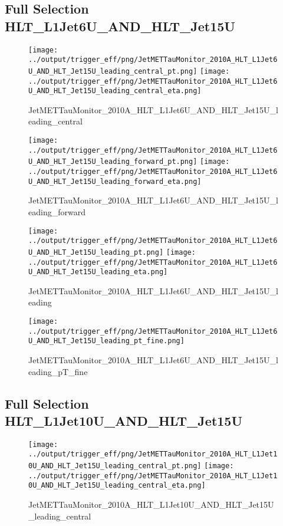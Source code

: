 \documentclass[11pt]{article}
\begin{document}
\newpage
\subsection{Full Selection HLT\_L1Jet6U\_AND\_HLT\_Jet15U}
\begin{figure}[ht]
\centering
\texttt{[image: ../output/trigger\_eff/png/JetMETTauMonitor\_2010A\_HLT\_L1Jet6U\_AND\_HLT\_Jet15U\_leading\_central\_pt.png]}
\texttt{[image: ../output/trigger\_eff/png/JetMETTauMonitor\_2010A\_HLT\_L1Jet6U\_AND\_HLT\_Jet15U\_leading\_central\_eta.png]}
\caption{JetMETTauMonitor\_2010A\_HLT\_L1Jet6U\_AND\_HLT\_Jet15U\_leading\_central}
\label{fig:jetmettaumon_HLT_L1Jet6U_AND_HLT_Jet15U_leading_central}
\end{figure}

\begin{figure}[ht]
\centering
\texttt{[image: ../output/trigger\_eff/png/JetMETTauMonitor\_2010A\_HLT\_L1Jet6U\_AND\_HLT\_Jet15U\_leading\_forward\_pt.png]}
\texttt{[image: ../output/trigger\_eff/png/JetMETTauMonitor\_2010A\_HLT\_L1Jet6U\_AND\_HLT\_Jet15U\_leading\_forward\_eta.png]}
\caption{JetMETTauMonitor\_2010A\_HLT\_L1Jet6U\_AND\_HLT\_Jet15U\_leading\_forward}
\label{fig:jetmettaumon_HLT_L1Jet6U_AND_HLT_Jet15U_leading_forward}
\end{figure}

\begin{figure}[ht]
\centering
\texttt{[image: ../output/trigger\_eff/png/JetMETTauMonitor\_2010A\_HLT\_L1Jet6U\_AND\_HLT\_Jet15U\_leading\_pt.png]}
\texttt{[image: ../output/trigger\_eff/png/JetMETTauMonitor\_2010A\_HLT\_L1Jet6U\_AND\_HLT\_Jet15U\_leading\_eta.png]}
\caption{JetMETTauMonitor\_2010A\_HLT\_L1Jet6U\_AND\_HLT\_Jet15U\_leading}
\label{fig:jetmettaumon_HLT_L1Jet6U_AND_HLT_Jet15U_leading}
\end{figure}

\begin{figure}[ht]
\centering
\texttt{[image: ../output/trigger\_eff/png/JetMETTauMonitor\_2010A\_HLT\_L1Jet6U\_AND\_HLT\_Jet15U\_leading\_pt\_fine.png]}
\caption{JetMETTauMonitor\_2010A\_HLT\_L1Jet6U\_AND\_HLT\_Jet15U\_leading\_pT\_fine}
\label{fig:jetmettaumon_HLT_L1Jet6U_AND_HLT_Jet15U_leading_pT_fine}
\end{figure}
\clearpage


\newpage
\subsection{Full Selection HLT\_L1Jet10U\_AND\_HLT\_Jet15U}
\begin{figure}[ht]
\centering
\texttt{[image: ../output/trigger\_eff/png/JetMETTauMonitor\_2010A\_HLT\_L1Jet10U\_AND\_HLT\_Jet15U\_leading\_central\_pt.png]}
\texttt{[image: ../output/trigger\_eff/png/JetMETTauMonitor\_2010A\_HLT\_L1Jet10U\_AND\_HLT\_Jet15U\_leading\_central\_eta.png]}
\caption{JetMETTauMonitor\_2010A\_HLT\_L1Jet10U\_AND\_HLT\_Jet15U\_leading\_central}
\label{fig:jetmettaumon_HLT_L1Jet10U_AND_HLT_Jet15U_leading_central}
\end{figure}
\end{document}
